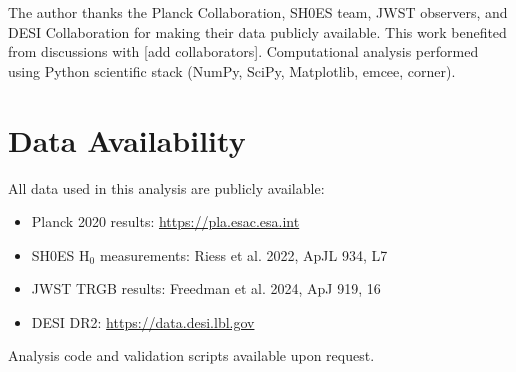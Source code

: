 \documentclass[11pt,letterpaper]{article}
\begin{document}
The author thanks the Planck Collaboration, SH0ES team, JWST observers, and DESI Collaboration for making their data publicly available. This work benefited from discussions with [add collaborators]. Computational analysis performed using Python scientific stack (NumPy, SciPy, Matplotlib, emcee, corner).

\section*{Data Availability}

All data used in this analysis are publicly available:
\begin{itemize}
\item Planck 2020 results: \url{https://pla.esac.esa.int}
\item SH0ES H$_0$ measurements: Riess et al. 2022, ApJL 934, L7
\item JWST TRGB results: Freedman et al. 2024, ApJ 919, 16
\item DESI DR2: \url{https://data.desi.lbl.gov}
\end{itemize}

\noindent Analysis code and validation scripts available upon request.
\end{document}
